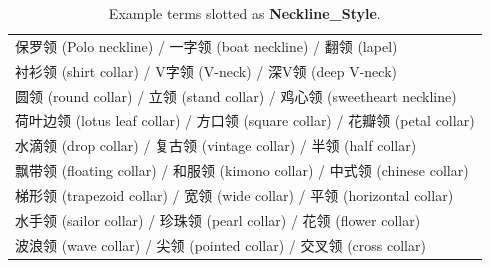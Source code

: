 \begin{table}[h]
	\centering
	\scriptsize
	\begin{tabular}{|l|}
		\hline
			保罗领 (Polo neckline) / 一字领 (boat neckline) / 翻领 (lapel)\\
			衬衫领 (shirt collar) / V字领 (V-neck) / 深V领 (deep V-neck) \\
			圆领 (round collar) / 立领 (stand collar) / 鸡心领 (sweetheart neckline) \\
			荷叶边领 (lotus leaf collar) / 方口领 (square collar) / 花瓣领 (petal collar) \\
			水滴领 (drop collar) / 复古领 (vintage collar) / 半领 (half collar) \\
			飘带领 (floating collar) / 和服领 (kimono collar) / 中式领 (chinese collar) \\
			梯形领 (trapezoid collar) / 宽领 (wide collar) / 平领 (horizontal collar) \\
			水手领 (sailor collar) / 珍珠领 (pearl collar) / 花领 (flower collar) \\
			波浪领 (wave collar) / 尖领 (pointed collar) / 交叉领 (cross collar) \\
		\hline
	\end{tabular}
	\caption{Example terms slotted as \textbf{Neckline\_Style}.}
	\label{tab:show_case}
	\vspace{-10pt}
\end{table}
